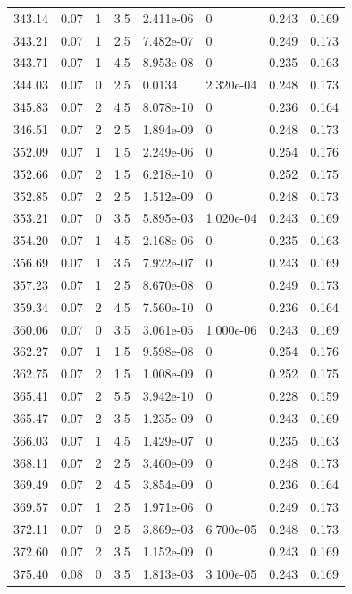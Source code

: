 \documentclass[preview]{standalone}
\begin{document}
{{{{{\begin{tabular}{L{1.2cm}C{1.2cm} C{0.3cm}C{0.5cm} C{1.4cm}C{1.4cm} C{1.4cm}C{1.4cm}}
  343.14  &  0.07  & 1     & 3.5 &  2.411e-06  & 0  & 0.243 &  0.169   \\ 
  343.21  &  0.07  & 1     & 2.5 &  7.482e-07  & 0  & 0.249 &  0.173   \\ 
  343.71  &  0.07  & 1     & 4.5 &  8.953e-08  & 0  & 0.235 &  0.163   \\ 
  344.03  &  0.07  & 0     & 2.5 &  0.0134  & 2.320e-04  & 0.248 &  0.173   \\ 
  345.83  &  0.07  & 2     & 4.5 &  8.078e-10  & 0  & 0.236 &  0.164   \\ 
  346.51  &  0.07  & 2     & 2.5 &  1.894e-09  & 0  & 0.248 &  0.173   \\ 
  352.09  &  0.07  & 1     & 1.5 &  2.249e-06  & 0  & 0.254 &  0.176   \\ 
  352.66  &  0.07  & 2     & 1.5 &  6.218e-10  & 0  & 0.252 &  0.175   \\ 
  352.85  &  0.07  & 2     & 2.5 &  1.512e-09  & 0  & 0.248 &  0.173   \\ 
  353.21  &  0.07  & 0     & 3.5 &  5.895e-03  & 1.020e-04  & 0.243 &  0.169   \\ 
  354.20  &  0.07  & 1     & 4.5 &  2.168e-06  & 0  & 0.235 &  0.163   \\ 
  356.69  &  0.07  & 1     & 3.5 &  7.922e-07  & 0  & 0.243 &  0.169   \\ 
  357.23  &  0.07  & 1     & 2.5 &  8.670e-08  & 0  & 0.249 &  0.173   \\ 
  359.34  &  0.07  & 2     & 4.5 &  7.560e-10  & 0  & 0.236 &  0.164   \\ 
  360.06  &  0.07  & 0     & 3.5 &  3.061e-05  & 1.000e-06  & 0.243 &  0.169   \\ 
  362.27  &  0.07  & 1     & 1.5 &  9.598e-08  & 0  & 0.254 &  0.176   \\ 
  362.75  &  0.07  & 2     & 1.5 &  1.008e-09  & 0  & 0.252 &  0.175   \\ 
  365.41  &  0.07  & 2     & 5.5 &  3.942e-10  & 0  & 0.228 &  0.159   \\ 
  365.47  &  0.07  & 2     & 3.5 &  1.235e-09  & 0  & 0.243 &  0.169   \\ 
  366.03  &  0.07  & 1     & 4.5 &  1.429e-07  & 0  & 0.235 &  0.163   \\ 
  368.11  &  0.07  & 2     & 2.5 &  3.460e-09  & 0  & 0.248 &  0.173   \\ 
  369.49  &  0.07  & 2     & 4.5 &  3.854e-09  & 0  & 0.236 &  0.164   \\ 
  369.57  &  0.07  & 1     & 2.5 &  1.971e-06  & 0  & 0.249 &  0.173   \\ 
  372.11  &  0.07  & 0     & 2.5 &  3.869e-03  & 6.700e-05  & 0.248 &  0.173   \\ 
  372.60  &  0.07  & 2     & 3.5 &  1.152e-09  & 0  & 0.243 &  0.169   \\ 
  375.40  &  0.08  & 0     & 3.5 &  1.813e-03  & 3.100e-05  & 0.243 &  0.169   \\ 
\hline 
\end{tabular} 

}}}}}
\end{document}
